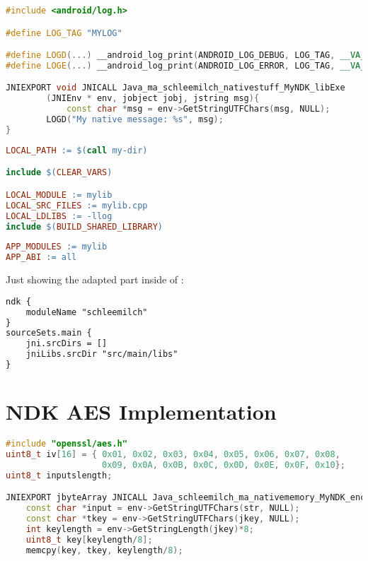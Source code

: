 \begin{appendices}
\begin{lstlisting}[language=C++, caption=mylib.cpp, label=nkd_sample_cpp]
#include <android/log.h>

#define LOG_TAG "MYLOG"

#define LOGD(...) __android_log_print(ANDROID_LOG_DEBUG, LOG_TAG, __VA_ARGS__)
#define LOGE(...) __android_log_print(ANDROID_LOG_ERROR, LOG_TAG, __VA_ARGS__)

JNIEXPORT void JNICALL Java_ma_schleemilch_nativestuff_MyNDK_libExe
        (JNIEnv * env, jobject jobj, jstring msg){
        	const char *msg = env->GetStringUTFChars(msg, NULL);
        LOGD("My native message: %s", msg);
}
\end{lstlisting}
\newpage
\begin{lstlisting}[language=make, caption=Android.mk, label=nkd_sample_make]
LOCAL_PATH := $(call my-dir)

include $(CLEAR_VARS)

LOCAL_MODULE := mylib
LOCAL_SRC_FILES := mylib.cpp
LOCAL_LDLIBS := -llog
include $(BUILD_SHARED_LIBRARY)
\end{lstlisting}

\begin{lstlisting}[language=make, caption=Application.mk, label=nkd_sample_app_make]
APP_MODULES := mylib
APP_ABI := all
\end{lstlisting}

Just showing the adapted part inside of :
\begin{lstlisting}[language=xml, caption=build.gradle, label=nkd_sample_gradle]
ndk {
	moduleName "schleemilch"
}
sourceSets.main {
	jni.srcDirs = []
	jniLibs.srcDir "src/main/libs"
}
\end{lstlisting}


\chapter{NDK AES Implementation}\label{chapter:ndk_aes_implementation}
\begin{lstlisting}[language=C++, caption=AES Encrypt(), label=nkd_aes_encrypt]
#include "openssl/aes.h"
uint8_t iv[16] = { 0x01, 0x02, 0x03, 0x04, 0x05, 0x06, 0x07, 0x08,
                   0x09, 0x0A, 0x0B, 0x0C, 0x0D, 0x0E, 0x0F, 0x10};
uint8_t inputslength;

JNIEXPORT jbyteArray JNICALL Java_schleemilch_ma_nativememory_MyNDK_encrypt (JNIEnv *env, jobject obj, jstring str, jstring jkey){
    const char *input = env->GetStringUTFChars(str, NULL);
    const char *tkey = env->GetStringUTFChars(jkey, NULL);
    int keylength = env->GetStringLength(jkey)*8;
    uint8_t key[keylength/8];
    memcpy(key, tkey, keylength/8);


\end{lstlisting}
\end{appendices}
